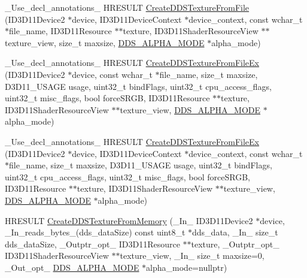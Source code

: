 \begin{DoxyCompactItemize}
\item 
\+\_\+\+Use\+\_\+decl\+\_\+annotations\+\_\+ H\+R\+E\+S\+U\+LT \hyperlink{namespacemage_a6385bd66f00f588eb7735234edd95f1e}{Create\+D\+D\+S\+Texture\+From\+File} (I\+D3\+D11\+Device2 $\ast$device, I\+D3\+D11\+Device\+Context $\ast$device\+\_\+context, const wchar\+\_\+t $\ast$file\+\_\+name, I\+D3\+D11\+Resource $\ast$$\ast$texture, I\+D3\+D11\+Shader\+Resource\+View $\ast$$\ast$texture\+\_\+view, size\+\_\+t maxsize, \hyperlink{namespacemage_a0c586a2bad862f4858900ca121ca80c2}{D\+D\+S\+\_\+\+A\+L\+P\+H\+A\+\_\+\+M\+O\+DE} $\ast$alpha\+\_\+mode)
\item 
\+\_\+\+Use\+\_\+decl\+\_\+annotations\+\_\+ H\+R\+E\+S\+U\+LT \hyperlink{namespacemage_aca15cd1804aa3b23b806a44c31019db8}{Create\+D\+D\+S\+Texture\+From\+File\+Ex} (I\+D3\+D11\+Device2 $\ast$device, const wchar\+\_\+t $\ast$file\+\_\+name, size\+\_\+t maxsize, D3\+D11\+\_\+\+U\+S\+A\+GE usage, uint32\+\_\+t bind\+Flags, uint32\+\_\+t cpu\+\_\+access\+\_\+flags, uint32\+\_\+t misc\+\_\+flags, bool force\+S\+R\+GB, I\+D3\+D11\+Resource $\ast$$\ast$texture, I\+D3\+D11\+Shader\+Resource\+View $\ast$$\ast$texture\+\_\+view, \hyperlink{namespacemage_a0c586a2bad862f4858900ca121ca80c2}{D\+D\+S\+\_\+\+A\+L\+P\+H\+A\+\_\+\+M\+O\+DE} $\ast$alpha\+\_\+mode)
\item 
\+\_\+\+Use\+\_\+decl\+\_\+annotations\+\_\+ H\+R\+E\+S\+U\+LT \hyperlink{namespacemage_a098c27d7fa0aa4437d4a878c7eb75792}{Create\+D\+D\+S\+Texture\+From\+File\+Ex} (I\+D3\+D11\+Device2 $\ast$device, I\+D3\+D11\+Device\+Context $\ast$device\+\_\+context, const wchar\+\_\+t $\ast$file\+\_\+name, size\+\_\+t maxsize, D3\+D11\+\_\+\+U\+S\+A\+GE usage, uint32\+\_\+t bind\+Flags, uint32\+\_\+t cpu\+\_\+access\+\_\+flags, uint32\+\_\+t misc\+\_\+flags, bool force\+S\+R\+GB, I\+D3\+D11\+Resource $\ast$$\ast$texture, I\+D3\+D11\+Shader\+Resource\+View $\ast$$\ast$texture\+\_\+view, \hyperlink{namespacemage_a0c586a2bad862f4858900ca121ca80c2}{D\+D\+S\+\_\+\+A\+L\+P\+H\+A\+\_\+\+M\+O\+DE} $\ast$alpha\+\_\+mode)
\item 
H\+R\+E\+S\+U\+LT \hyperlink{namespacemage_ae694dfc6b3a2c61338a346041f223306}{Create\+D\+D\+S\+Texture\+From\+Memory} (\+\_\+\+In\+\_\+ I\+D3\+D11\+Device2 $\ast$device, \+\_\+\+In\+\_\+reads\+\_\+bytes\+\_\+(dds\+\_\+data\+Size) const uint8\+\_\+t $\ast$dds\+\_\+data, \+\_\+\+In\+\_\+ size\+\_\+t dds\+\_\+data\+Size, \+\_\+\+Outptr\+\_\+opt\+\_\+ I\+D3\+D11\+Resource $\ast$$\ast$texture, \+\_\+\+Outptr\+\_\+opt\+\_\+ I\+D3\+D11\+Shader\+Resource\+View $\ast$$\ast$texture\+\_\+view, \+\_\+\+In\+\_\+ size\+\_\+t maxsize=0, \+\_\+\+Out\+\_\+opt\+\_\+ \hyperlink{namespacemage_a0c586a2bad862f4858900ca121ca80c2}{D\+D\+S\+\_\+\+A\+L\+P\+H\+A\+\_\+\+M\+O\+DE} $\ast$alpha\+\_\+mode=nullptr)

\end{DoxyCompactItemize}
